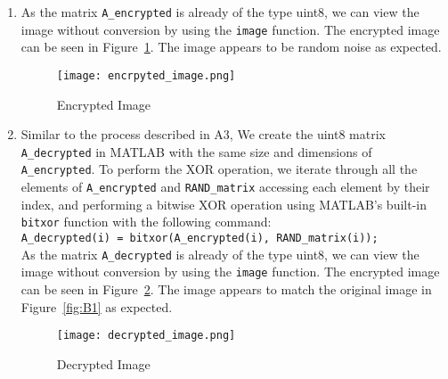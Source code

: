 \begin{enumerate}[wide, label=(B\arabic*)]
\item
As the matrix \texttt{A\_encrypted} is already of the type uint8, we can view the image without conversion by using the \texttt{image} function. The encrypted image can be seen in Figure~\ref{fig:B4}. The image appears to be random noise as expected.
\begin{figure}[htp]
    \centering
    \texttt{[image: encrpyted\_image.png]}
    \caption{\label{fig:B4}Encrypted Image}
\end{figure}

\item
Similar to the process described in A3, We create the uint8 matrix \texttt{A\_decrypted} in MATLAB with the same size and dimensions of \texttt{A\_encrypted}. To perform the XOR operation, we iterate through all the elements of \texttt{A\_encrypted} and \texttt{RAND\_matrix} accessing each element by their index, and performing a bitwise XOR operation using MATLAB's built-in \texttt{bitxor} function with the following command:\\
\texttt{A\_decrypted(i) = bitxor(A\_encrypted(i), RAND\_matrix(i));}\\
As the matrix \texttt{A\_decrypted} is already of the type uint8, we can view the image without conversion by using the \texttt{image} function. The encrypted image can be seen in Figure~\ref{fig:B5}. The image appears to match the original image in Figure~\ref{fig:B1} as expected.
\begin{figure}[htp]
    \centering
    \texttt{[image: decrypted\_image.png]}
    \caption{\label{fig:B5}Decrypted Image}
\end{figure}


\end{enumerate}
